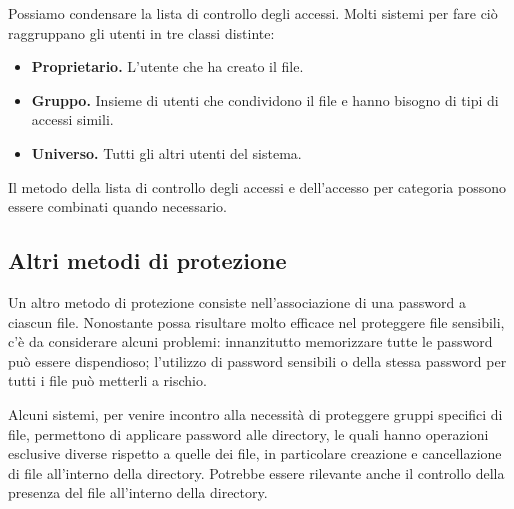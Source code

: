         Possiamo condensare la lista di controllo degli accessi. Molti sistemi per fare ciò raggruppano gli utenti in tre classi distinte:
        \begin{itemize}
            \item \textbf{Proprietario.} L'utente che ha creato il file.
            
            \item \textbf{Gruppo.} Insieme di utenti che condividono il file e hanno bisogno di tipi di accessi simili.
            
            \item \textbf{Universo.} Tutti gli altri utenti del sistema.
        \end{itemize}
        
        Il metodo della lista di controllo degli accessi e dell'accesso per categoria possono essere combinati quando necessario.
        
    \subsection{Altri metodi di protezione}
        Un altro metodo di protezione consiste nell'associazione di una password a ciascun file. Nonostante possa risultare molto efficace nel proteggere file sensibili, c'è da considerare alcuni problemi: innanzitutto memorizzare tutte le password può essere dispendioso; l'utilizzo di password sensibili o della stessa password per tutti i file può metterli a rischio.
        
        Alcuni sistemi, per venire incontro alla necessità di proteggere gruppi specifici di file, permettono di applicare password alle directory, le quali hanno operazioni esclusive diverse rispetto a quelle dei file, in particolare creazione e cancellazione di file all'interno della directory. Potrebbe essere rilevante anche il controllo della presenza del file all'interno della directory.